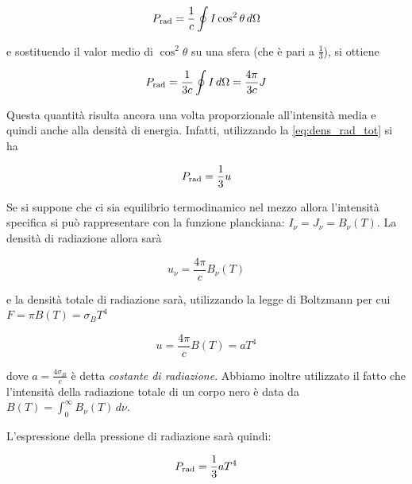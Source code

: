 \begin{equation}
    P_{\rm rad}=\frac{1}{c} \oint I \cos^2 \theta \, d \Omega
\end{equation}

e sostituendo il valor medio di $\cos^2 \theta$ su una sfera (che è pari a $\frac13$), si ottiene

\begin{equation}
    P_{\rm rad}=\frac{1}{3c} \oint I \, d \Omega=\frac{4 \pi}{3 c}J
\end{equation}

Questa quantità risulta ancora una volta proporzionale all'intensità media e quindi anche alla densità di energia. Infatti, utilizzando la \eqref{eq:dens_rad_tot} si ha

\begin{equation}
    P_{\rm rad}=\frac{1}{3} u
\end{equation}

Se si suppone che ci sia equilibrio termodinamico nel mezzo allora l'intensità specifica si può rappresentare con la funzione planckiana: $I_{\nu}=J_{\nu}=B_{\nu}(T)$. La densità di radiazione allora sarà

\begin{equation*}
    u_{\nu}=\frac{4\pi}{c}B_{\nu}(T)
\end{equation*}

e la densità totale di radiazione sarà, utilizzando la legge di Boltzmann per cui $F=\pi B(T)=\sigma_B T^4$

\begin{equation}
    u=\frac{4 \pi}{c}B(T)=aT^4
\end{equation}

dove $a=\frac{4 \sigma_B}{c}$ è detta \textit{costante di radiazione}. Abbiamo inoltre utilizzato il fatto che l'intensità della radiazione totale di un corpo nero è data da $B(T)=\int_{0}^{\infty} B_{\nu}(T) \, d\nu$.

L'espressione della pressione di radiazione sarà quindi:

\begin{equation}
    P_{\rm rad}=\frac{1}{3} a T^{4}
    \label{eq:press_rad_eq_term}
\end{equation}

